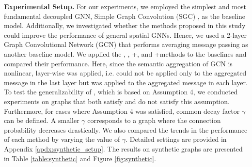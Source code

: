 \vspace{-10pt}
\textbf{Experimental Setup.} For our experiments, we employed the simplest and most fundamental decoupled GNN, Simple Graph Convolution (SGC) \cite{SGC}, as the baseline model. Additionally, we investigated whether the methods proposed in this study could improve the performance of general spatial GNNs. Hence, we used a 2-layer Graph Convolutional Network (GCN) \cite{GCN} that performs averaging message passing as another baseline model. We applied the \MMP, \PMP, \PMP+\PNY, and \PMP+\JJnorm methods to the baselines and compared their performance. Here, since the semantic aggregation of GCN is nonlinear, layer-wise \JJnorm was applied, i.e. \JJnorm could not be applied only to the aggregated message in the last layer but was applied to the aggregated message in each layer.  To test the generalizability of \JJnorm, which is based on Assumption 4, we conducted experiments on graphs that both satisfy and do not satisfy this assumption. Furthermore, for cases where Assumption 4 was satisfied, common decay factor $\gamma$ can be defined. A smaller $\gamma$ corresponds to a graph where the connection probability decreases drastically. We also compared the trends in the performance of each \IMPaCT method by varying the value of $\gamma$. Detailed settings are provided in Appendix \ref{apdx:synthetic_setup}. The results on synthetic graphs are presented in Table \ref{table:synthetic} and Figure \ref{fig:synthetic}.%


